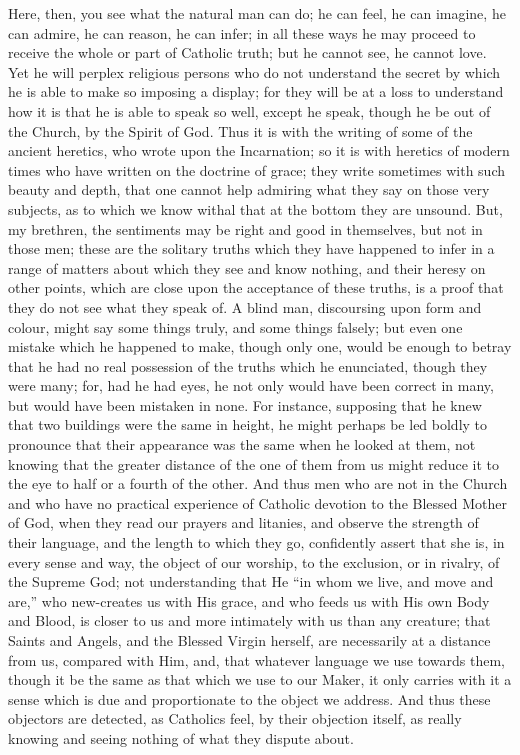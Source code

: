 Here, then, you see what the natural man can do; he can feel, he
can imagine, he can admire, he can reason, he can infer; in all these
ways he may proceed to receive the whole or part of Catholic truth;
but he cannot see, he cannot love. Yet he will perplex religious
persons who do not understand the secret by which he is able to make
so imposing a display; for they will be at a loss to understand how it
is that he is able to speak so well, except he speak, though he be out
of the Church, by the Spirit of God. Thus it is with the writing of
some of the ancient heretics, who wrote upon the Incarnation; so it is
with heretics of modern times who have written on the doctrine of
grace; they write sometimes with such beauty and depth, that one
cannot help admiring what they say on those very subjects, as to which
we know withal that at the bottom they are unsound. But, my brethren,
the sentiments may be right and good in themselves, but not in those
men; these are the solitary truths which they have happened to infer
in a range of matters about which they see and know nothing, and their
heresy on other points, which are close upon the acceptance of these
truths, is a proof that they do not see what they speak of. A blind
man, discoursing upon form and colour, might say some things truly,
and some things falsely; but even one mistake which he happened to
make, though only one, would be enough to betray that he had no real
possession of the truths which he enunciated, though they were many;
for, had he had eyes, he not only would have been correct in many, but
would have been mistaken in none. For instance, supposing that he knew
that two buildings were the same in height, he might perhaps be led
boldly to pronounce that their appearance was the same when he looked
at them, not knowing that the greater distance of the one of them from
us might reduce it to the eye to half or a fourth of the other. And
thus men who are not in the Church and who have no practical
experience of Catholic devotion to the Blessed Mother of God, when
they read our prayers and litanies, and observe the strength of their
language, and the length to which they go, confidently assert that she
is, in every sense and way, the object of our worship, to the
exclusion, or in rivalry, of the Supreme God; not understanding that
He ``in whom we live, and move and are,'' who new-creates us
with His grace, and who feeds us with His own Body and Blood, is
closer to us and more intimately with us than any creature; that
Saints and Angels, and the Blessed Virgin herself, are necessarily at
a distance from us, compared with Him, and, that whatever language we use
towards them, though it be the same as that which we use to our Maker,
it only carries with it a sense which is due and proportionate to the
object we address. And thus these objectors are detected, as Catholics
feel, by their objection itself, as really knowing and seeing nothing
of what they dispute about.


